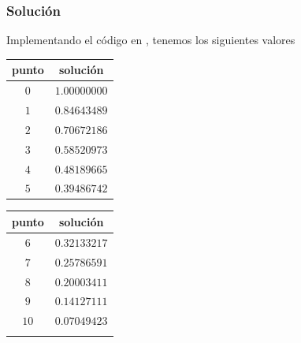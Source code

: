 \begin{frame}[plain]
\frametitle{Solución}
Implementando el código en \python, tenemos los siguientes valores
\\
\medskip
\begin{minipage}{4cm}
\begin{tabular}{c | c}
punto & solución \\ \hline
$0$ & $1.00000000$ \\
$1$ & $0.84643489$ \\
$2$ & $0.70672186$ \\
$3$ & $0.58520973$ \\
$4$ & $0.48189665$ \\
$5$ & $0.39486742$ \\
\end{tabular}
\end{minipage}
\hspace{0.5cm}
\begin{minipage}{4cm}
\begin{tabular}{c | c}
punto & solución \\ \hline
$6$ & $0.32133217$ \\
$7$ & $0.25786591$ \\
$8$ & $0.20003411$ \\
$9$ & $0.14127111$ \\
$10$ & $0.07049423$ \\
 & 
\end{tabular}
\end{minipage}
\end{frame}
